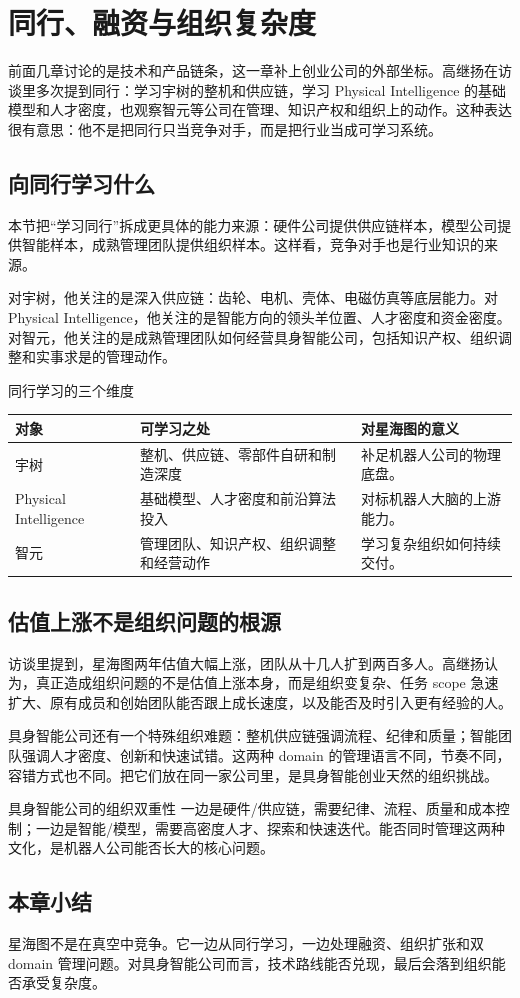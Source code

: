 \section{同行、融资与组织复杂度}

前面几章讨论的是技术和产品链条，这一章补上创业公司的外部坐标。高继扬在访谈里多次提到同行：学习宇树的整机和供应链，学习 Physical Intelligence 的基础模型和人才密度，也观察智元等公司在管理、知识产权和组织上的动作。这种表达很有意思：他不是把同行只当竞争对手，而是把行业当成可学习系统。

\subsection{向同行学习什么}

本节把“学习同行”拆成更具体的能力来源：硬件公司提供供应链样本，模型公司提供智能样本，成熟管理团队提供组织样本。这样看，竞争对手也是行业知识的来源。

对宇树，他关注的是深入供应链：齿轮、电机、壳体、电磁仿真等底层能力。对 Physical Intelligence，他关注的是智能方向的领头羊位置、人才密度和资金密度。对智元，他关注的是成熟管理团队如何经营具身智能公司，包括知识产权、组织调整和实事求是的管理动作。

\begin{knowledgebox}{同行学习的三个维度}
\begin{tabularx}{\textwidth}{p{}p{}X}
\toprule
对象 & 可学习之处 & 对星海图的意义 \\
\midrule
宇树 & 整机、供应链、零部件自研和制造深度 & 补足机器人公司的物理底盘。 \\
Physical Intelligence & 基础模型、人才密度和前沿算法投入 & 对标机器人大脑的上游能力。 \\
智元 & 管理团队、知识产权、组织调整和经营动作 & 学习复杂组织如何持续交付。 \\
\bottomrule
\end{tabularx}
\end{knowledgebox}

\subsection{估值上涨不是组织问题的根源}

访谈里提到，星海图两年估值大幅上涨，团队从十几人扩到两百多人。高继扬认为，真正造成组织问题的不是估值上涨本身，而是组织变复杂、任务 scope 急速扩大、原有成员和创始团队能否跟上成长速度，以及能否及时引入更有经验的人。

具身智能公司还有一个特殊组织难题：整机供应链强调流程、纪律和质量；智能团队强调人才密度、创新和快速试错。这两种 domain 的管理语言不同，节奏不同，容错方式也不同。把它们放在同一家公司里，是具身智能创业天然的组织挑战。

\begin{importantbox}{具身智能公司的组织双重性}
一边是硬件/供应链，需要纪律、流程、质量和成本控制；一边是智能/模型，需要高密度人才、探索和快速迭代。能否同时管理这两种文化，是机器人公司能否长大的核心问题。
\end{importantbox}

\subsection{本章小结}

星海图不是在真空中竞争。它一边从同行学习，一边处理融资、组织扩张和双 domain 管理问题。对具身智能公司而言，技术路线能否兑现，最后会落到组织能否承受复杂度。


